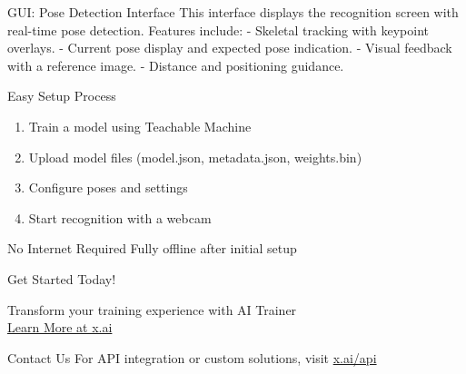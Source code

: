 \documentclass[11pt]{beamer}
\begin{document}
\begin{frame}{GUI: Pose Detection Interface}
    \small{This interface displays the recognition screen with real-time pose detection. Features include:
    - Skeletal tracking with keypoint overlays.
    - Current pose display and expected pose indication.
    - Visual feedback with a reference image.
    - Distance and positioning guidance.}
\end{frame}

\begin{frame}{Easy Setup Process}
    \begin{enumerate}
        \item Train a model using Teachable Machine
        \item Upload model files (model.json, metadata.json, weights.bin)
        \item Configure poses and settings
        \item Start recognition with a webcam
    \end{enumerate}
    \vspace{0.5cm}
    \begin{alertblock}{No Internet Required}
        Fully offline after initial setup
    \end{alertblock}
\end{frame}

\begin{frame}{Get Started Today!}
    \begin{center}
        \Large Transform your training experience with AI Trainer\\
        \vspace{0.5cm}
        \href{https://x.ai/grok}{\color{primary}Learn More at x.ai}
    \end{center}
    \begin{block}{Contact Us}
        For API integration or custom solutions, visit \href{https://x.ai/api}{\color{primary}x.ai/api}
    \end{block}
\end{frame}
\end{document}
